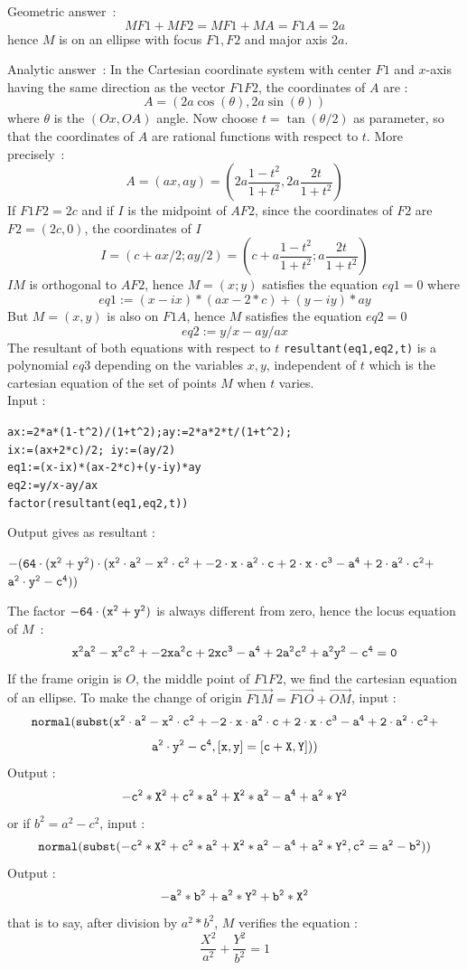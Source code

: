 \documentclass[a4paper,11pt]{book}
\begin{document}
Geometric answer~:
\[ MF1+MF2=MF1+MA=F1A=2a\] 
hence $M$ is on an ellipse with focus  $F1,F2$ and major axis $2a$.

Analytic answer~:
In the Cartesian coordinate system with center $F1$ 
and $x$-axis having the same 
direction as the vector $F1F2$, the coordinates of $A$ are :
\[  A= (2a\cos(\theta),2a\sin(\theta)) \] 
where $\theta$ is the $(Ox,OA)$ angle.
Now choose $t=\tan(\theta/2)$  as parameter, so that the coordinates
of  $A$ are rational functions with respect to $t$.
More precisely~:
\[ A=(ax,ay)=(2a\frac{1-t^2}{1+t^2},2a\frac{2t}{1+t^2}) \]
If $F1F2=2c$ and if $I$ is the midpoint of $AF2$, 
since the coordinates of $F2$ are $F2=(2c,0)$, the coordinates 
of $I$ 
\[ I=(c+ax/2;ay/2)=(c+a\frac{1-t^2}{1+t^2};a\frac{2t}{1+t^2}) \]
$IM$ is  orthogonal to $AF2$, hence $M=(x;y)$ satisfies the equation
$eq1=0$ where 
\[ eq1:=(x-ix)*(ax-2*c)+(y-iy)*ay \]
But $M=(x,y)$ is also on $F1A$, hence $M$ satisfies the equation $eq2=0$
\[ eq2:=y/x-ay/ax \]
The resultant of both equations with respect to $t$ 
{\tt resultant(eq1,eq2,t)} is a polynomial $eq3$ depending on the
variables $x,y$, independent of $t$ which is the cartesian equation
of the set of points $M$ when $t$ varies.\\
Input :
\begin{center}
{\tt ax:=2*a*(1-t\verb|^|2)/(1+t\verb|^|2);ay:=2*a*2*t/(1+t\verb|^|2);}\\
{\tt ix:=(ax+2*c)/2; iy:=(ay/2)}\\
{\tt eq1:=(x-ix)*(ax-2*c)+(y-iy)*ay}\\
{\tt eq2:=y/x-ay/ax}\\
{\tt factor(resultant(eq1,eq2,t))}
\end{center}
Output gives as resultant :\\
\begin{center}
${\tt -(64\cdot(x^2+y^2)\cdot(x^2\cdot a^2-x^2\cdot c^2+-2\cdot x\cdot a^2\cdot
c+2\cdot x\cdot c^3-a^4+2\cdot a^2\cdot c^2+}$\\
${\tt  a^2\cdot y^2-c^4))}$
\end{center}
The factor ${\tt -64\cdot (x^2+y^2)}$ is always different from zero, 
hence the locus equation of $M$~:
\[ {\tt x^2a^2-x^2c^2+-2xa^2c+2xc^3-a^4+2a^2c^2+a^2y^2-c^4=0} \]
If the frame origin is $O$, the middle point of $F1F2$,
we find the cartesian equation of an ellipse. 
To make the change of origin 
$\overrightarrow{F1M}=\overrightarrow{F1O}+\overrightarrow{OM}$, input :
\[ {\tt normal(subst(x^2\cdot a^2-x^2\cdot c^2+-2\cdot x\cdot a^2\cdot
c+2\cdot x\cdot c^3-a^4+2\cdot a^2\cdot c^2+} \]
\[ {\tt  a^2\cdot y^2-c^4,[x,y]=[c+X,Y]))} \]
Output :
\[ {\tt -c^2*X^2+c^2*a^2+X^2*a^2-a^4+a^2*Y^2} \]
or if $b^2=a^2-c^2$, input :
\[ {\tt
  normal(subst(-c^2*X^2+c^2*a^2+X^2*a^2-a^4+a^2*Y^2,c^2=a^2-b^2))} \]
Output :
\[ {\tt -a^2*b^2+a^2*Y^2+b^2*X^2} \]
that is to say, after division by $a^2*b^2$, $M$ verifies the equation :
\[ \frac{X^2}{a^2}+\frac{Y^2}{b^2}=1 \]
\end{document}
